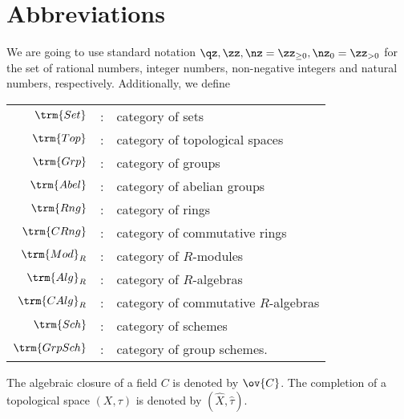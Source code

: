 \section*{Abbreviations}
We are going to use standard notation $\qz, \zz, \nz = \zz_{\geq0}, \nz_0 = \zz_{>0}$ for the set of rational numbers, integer numbers, non-negative integers and natural numbers, respectively. Additionally, we define
\begin{longtable}{rcl}
$\trm{Set}$ &:& category of sets\\
$\trm{Top}$ &:& category of topological spaces\\
$\trm{Grp}$ &:& category of groups\\
$\trm{Abel}$ &:& category of abelian groups\\
$\trm{Rng}$ &:& category of rings\\
$\trm{CRng}$ &:& category of commutative rings\\
$\trm{Mod}_R$ &:& category of $R$-modules\\
$\trm{Alg}_R$ &:& category of $R$-algebras\\
$\trm{CAlg}_R$ &:& category of commutative $R$-algebras\\
$\trm{Sch}$ &:& category of schemes\\
$\trm{GrpSch}$ &:& category of group schemes.\\
\end{longtable}
The algebraic closure of a field $C$ is denoted by $\ov{C}$. The completion of a topological space $(X, \tau)$ is denoted by $(\hat{X}, \hat{\tau})$.